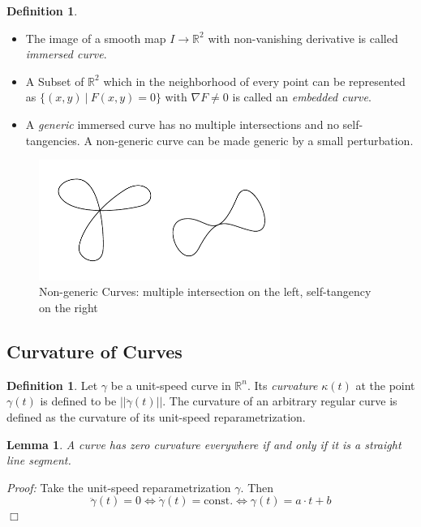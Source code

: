 \documentclass[a4paper,11pt,notitlepage,fullpage]{paper}
\theoremstyle{plain}
\newtheorem{lem}[thm]{Lemma}
\theoremstyle{definition}
\newtheorem{defn}[thm]{Definition} %
\begin{document}
\begin{defn}
\begin{itemize}
\item The image of a smooth map $I \to \mathbb R^2$ with non-vanishing derivative is called \emph{immersed curve}.

\item A Subset of $\mathbb R^2$ which in the neighborhood of every point can be represented as $\{(x,y) ~|~ F(x,y) = 0\}$ with $\nabla F \neq 0$ is called an \emph{embedded curve}.

\item A \emph{generic} immersed curve has no multiple intersections and no self-tangencies. A non-generic curve can be made generic by a small perturbation.
\end{itemize}
\end{defn}

\begin{figure}
\centering
\includegraphics[width = 0.7\textwidth]{img/nongeneric}
\caption{Non-generic Curves: multiple intersection on the left, self-tangency on the right}
\label{fig:non-generic}
\end{figure}


\subsection{Curvature of Curves}

\begin{defn}
Let $\gamma$ be a unit-speed curve in $\mathbb R^n$. Its \emph{curvature} $\kappa(t)$ at the point $\gamma(t)$ is  defined to be $|| \ddot\gamma(t)||$. The curvature of an arbitrary regular curve is defined as the curvature of  its unit-speed reparametrization.
\end{defn}

\begin{lem}
A curve has zero curvature everywhere if and only if it is a straight line segment.
\end{lem}
\emph{Proof:} Take the unit-speed reparametrization $\gamma$. Then 
\begin{equation*}
\ddot\gamma(t) = 0 \Leftrightarrow \dot\gamma(t) = \text{const.} \Leftrightarrow \gamma(t) = a\cdot t+b
\end{equation*}
\hfill $\Box$
\end{document}
